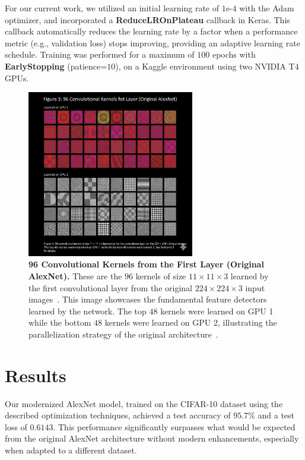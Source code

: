 \documentclass{article}
\begin{document}
For our current work, we utilized an initial learning rate of $1\text{e-}4$ with the Adam optimizer, and incorporated a \textbf{ReduceLROnPlateau} callback in Keras. This callback automatically reduces the learning rate by a factor when a performance metric (e.g., validation loss) stops improving, providing an adaptive learning rate schedule. Training was performed for a maximum of $100$ epochs with \textbf{EarlyStopping} (patience=$10$), on a Kaggle environment using two NVIDIA T4 GPUs.


\begin{figure}[h!]
    \centering
    \includegraphics[width=0.65\textwidth]{images/figure3_kernels.png} 
    \caption{
        \textbf{96 Convolutional Kernels from the First Layer (Original AlexNet).} These are the $96$ kernels of size $11\times 11\times 3$ learned by the first convolutional layer from the original $224\times 224\times 3$ input images~\cite{krizhevsky2012imagenet}. This image showcases the fundamental feature detectors learned by the network. The top $48$ kernels were learned on GPU 1 while the bottom $48$ kernels were learned on GPU 2, illustrating the parallelization strategy of the original architecture~\cite{krizhevsky2012imagenet}.
    }
    \label{fig:first_layer_kernels}
\end{figure}

\newpage

\section{Results}
\noindent
Our modernized AlexNet model, trained on the CIFAR-10 dataset using the described optimization techniques, achieved a test accuracy of $95.7\%$ and a test loss of $0.6143$. This performance significantly surpasses what would be expected from the original AlexNet architecture without modern enhancements, especially when adapted to a different dataset.
\end{document}
